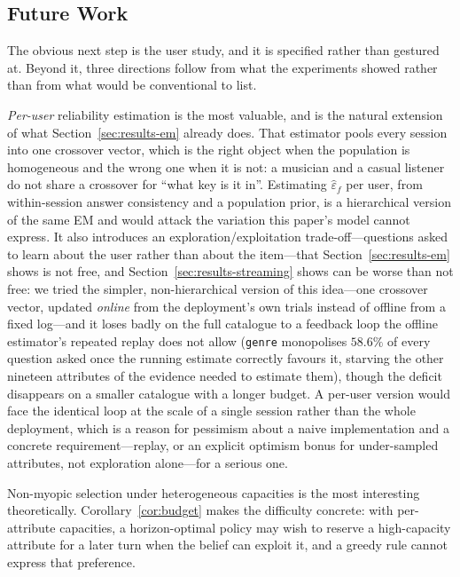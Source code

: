 \subsection{Future Work}

The obvious next step is the user study, and it is specified rather than
gestured at. Beyond it, three directions follow from what the experiments
showed rather than from what would be conventional to list.

\emph{Per-user} reliability estimation is the most valuable, and is the natural
extension of what Section~\ref{sec:results-em} already does. That estimator
pools every session into one crossover vector, which is the right object when
the population is homogeneous and the wrong one when it is not: a musician and
a casual listener do not share a crossover for ``what key is it in''. Estimating
$\hat\varepsilon_f$ per user, from within-session answer consistency and a
population prior, is a hierarchical version of the same EM and would attack the
variation this paper's model cannot express. It also introduces an
exploration/exploitation trade-off---questions asked to learn about the user
rather than about the item---that Section~\ref{sec:results-em} shows is not
free, and Section~\ref{sec:results-streaming} shows can be worse than not
free: we tried the simpler, non-hierarchical version of this idea---one
crossover vector, updated \emph{online} from the deployment's own trials
instead of offline from a fixed log---and it loses badly on the full
catalogue to a feedback loop the offline estimator's repeated replay does not
allow (\texttt{genre} monopolises $58.6\%$ of every question asked once the
running estimate correctly favours it, starving the other nineteen
attributes of the evidence needed to estimate them), though the deficit
disappears on a smaller catalogue with a longer budget. A per-user version
would face the identical loop at the scale of a single session rather than
the whole deployment, which is a reason for pessimism about a naive
implementation and a concrete requirement---replay, or an explicit
optimism bonus for under-sampled attributes, not exploration alone---for a
serious one.

Non-myopic selection under heterogeneous capacities is the most interesting
theoretically. Corollary~\ref{cor:budget} makes the difficulty concrete: with
per-attribute capacities, a horizon-optimal policy may wish to reserve a
high-capacity attribute for a later turn when the belief can exploit it, and a
greedy rule cannot express that preference.

